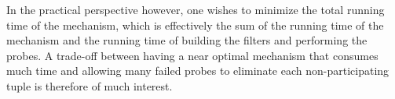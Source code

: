 In the practical perspective however, one wishes to minimize the total running time of the mechanism, which is effectively the sum of the running time of the mechanism and the running time of building the filters and performing the probes. A trade-off between having a near optimal mechanism that consumes much time and allowing many failed probes to eliminate each non-participating tuple is therefore of much interest. 

